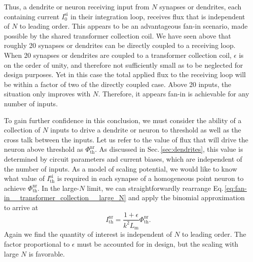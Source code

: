 \documentclass[twocolumn]{article}
\begin{document}
Thus, a dendrite or neuron receiving input from $N$ synapses or dendrites, each containing current $I^{\mathrm{si}}_0$ in their integration loop, receives flux that is independent of $N$ to leading order. This appears to be an advantageous fan-in scenario, made possible by the shared transformer collection coil. We have seen above that roughly 20 synapses or dendrites can be directly coupled to a receiving loop. When 20 synapses or dendrites are coupled to a transformer collection coil, $\epsilon$ is on the order of unity, and therefore not sufficiently small as to be neglected for design purposes. Yet in this case the total applied flux to the receiving loop will be within a factor of two of the directly coupled case. Above 20 inputs, the situation only improves with $N$. Therefore, it appears fan-in is achievable for any number of inputs. 

To gain further confidence in this conclusion, we must consider the ability of a collection of $N$ inputs to drive a dendrite or neuron to threshold as well as the cross talk between the inputs. Let us refer to the value of flux that will drive the neuron above threshold as $\Phi^{\mathrm{nr}}_{\mathrm{th}}$. As discussed in Sec.\,\ref{sec:dendrites}, this value is determined by circuit parameters and current biases, which are independent of the number of inputs. As a model of scaling potential, we would like to know what value of $I^{\mathrm{si}}_{\mathrm{th}}$ is required in each synapse of a homogeneous point neuron to achieve $\Phi^{\mathrm{nr}}_{\mathrm{th}}$. In the large-$N$ limit, we can straightforwardly rearrange Eq.\,\ref{eq:fan-in__transformer_collection__large_N} and apply the binomial approximation to arrive at
\begin{equation}
\label{eq:fan-in__transformer_collection__threshold_current}
I^{\mathrm{nr}}_{\mathrm{th}} = \frac{1+\epsilon}{k^2 L_{\mathrm{m}}} \Phi^{\mathrm{nr}}_{\mathrm{th}}.
\end{equation}
Again we find the quantity of interest is independent of $N$ to leading order. The factor proportional to $\epsilon$ must be accounted for in design, but the scaling with large $N$ is favorable. 
\end{document}
